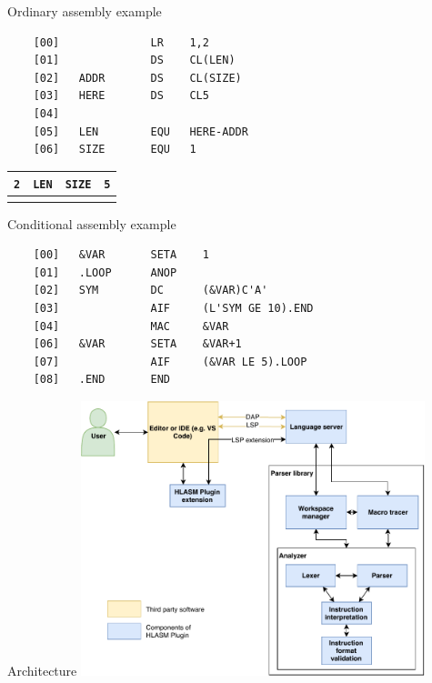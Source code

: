 \documentclass[10pt]{beamer}
\begin{document}
\begin{frame}[fragile]{Ordinary assembly example}
  
	\begin{verbatim}
	[00]              LR    1,2
	[01]              DS    CL(LEN)
	[02]   ADDR       DS    CL(SIZE)
	[03]   HERE       DS    CL5
	[04]
	[05]   LEN        EQU   HERE-ADDR
	[06]   SIZE       EQU   1
	\end{verbatim}
	
	\begin{table}[]
		\begin{tabular}{llll}
			\hline
			\multicolumn{1}{|p{1cm}|}{\texttt{2}\hspace{5cm}} & \multicolumn{1}{p{1cm}|}{\texttt{LEN}} & \multicolumn{1}{p{1cm}|}{\texttt{SIZE}} & \multicolumn{1}{p{1cm}|}{\texttt{5}}  \\ \hline
			 &   & \multicolumn{1}{l}{\hspace{-10pt}\rotatebox{90}{\texttt{ADDR->} }}  & \multicolumn{1}{l}{\hspace{-10pt}\rotatebox{90}{\texttt{HERE->}}}                       
		\end{tabular}
	\end{table}
	
\end{frame}

\begin{frame}[fragile]{Conditional assembly example}


\begin{verbatim}
	[00]   &VAR       SETA    1
	[01]   .LOOP      ANOP         
	[02]   SYM        DC      (&VAR)C'A'
	[03]              AIF     (L'SYM GE 10).END
	[04]              MAC     &VAR
	[06]   &VAR       SETA    &VAR+1
	[07]              AIF     (&VAR LE 5).LOOP
	[08]   .END       END     
\end{verbatim}


\end{frame}

\begin{frame}[fragile]{Architecture}
\centering
\includegraphics[width=10cm]{img/hlasm_architecture}

\end{frame}
\end{document}
